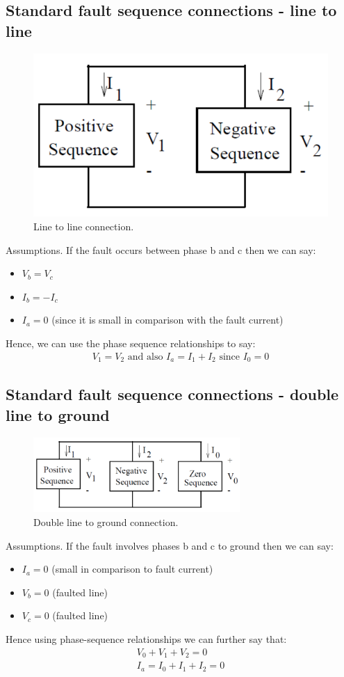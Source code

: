 \subsection{Standard fault sequence connections - line to line}
\begin{figure}[H]
	\centering
	\includegraphics[width = 0.4 \textwidth]{./img/figure37.png}
	\caption{Line to line connection.}
\end{figure}
Assumptions. If the fault occurs between phase b and c then we can say:
\begin{itemize}
	\item $V_b = V_c$
	\item $I_b = -I_c$
	\item $I_a = 0$ (since it is small in comparison with the fault current)
\end{itemize}
Hence, we can use the phase sequence relationships to say:
\begin{gather}
	V_1 = V_2 \textrm{ and also } I_a = I_1 + I_2 \textrm{ since } I_0 = 0
\end{gather}
\subsection{Standard fault sequence connections - double line to ground}
\begin{figure}[H]
	\centering
	\includegraphics[width = 0.7\textwidth]{./img/figure38.png}
	\caption{Double line to ground connection.}
\end{figure}
Assumptions. If the fault involves phases b and c to ground then we can say:
\begin{itemize}
	\item $I_a = 0$ (small in comparison to fault current)
	\item $V_b = 0$ (faulted line)
	\item $V_c = 0$ (faulted line)
\end{itemize}
Hence using phase-sequence relationships we can further say that:
\begin{gather}
	V_0 + V_1 + V_2 = 0\\
	I_a = I_0 + I_1 + I_2 = 0
\end{gather}
